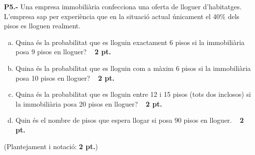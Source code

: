 \documentclass{report}
\begin{document}
\vspace{0.5 cm}
\noindent\textbf{P5.-}
Una empresa immobili\`aria confecciona una oferta de lloguer d'habitatges. 
L'empresa sap per experi\`encia que en la situaci\'o actual \'unicament el 40\% dels pisos es lloguen realment.
\begin{enumerate}[a)]
\item  Quina \'es la probabilitat que es lloguin exactament 6 pisos si la immobili\`aria posa 9 pisos en lloguer?
\ \hfill{\textbf{ 2 pt.}}
\item  Quina \'es la probabilitat que es lloguin com a m\`axim 6 pisos si la immobili\`aria posa 10 pisos en lloguer?
\ \hfill{\textbf{ 2 pt.}}
\item  Quina \'es la probabilitat que es lloguin entre 12 i 15 pisos (tots dos inclosos) si la immobili\`aria posa 20 pisos en lloguer?
\ \hfill{\textbf{ 2 pt.}}
\item Quin és el nombre de pisos que espera llogar si posa 90 pisos en lloguer.
\ \hfill{\textbf{ 2 pt.}}
\end{enumerate}
(Plantejament i notació: \textbf{ 2 pt.})
%
%
\end{document}
